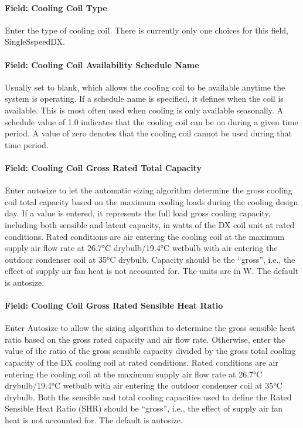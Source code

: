 \paragraph{Field: Cooling Coil Type}\label{field-cooling-coil-type-2}

Enter the type of cooling coil. There is currently only one choices for this field, SingleSspeedDX.

\paragraph{Field: Cooling Coil Availability Schedule Name}\label{field-cooling-coil-availability-schedule-name-2}

Usually set to blank, which allows the cooling coil to be available anytime the system is operating. If a schedule name is specified, it defines when the coil is available. This is most often used when cooling is only available seasonally. A schedule value of 1.0 indicates that the cooling coil can be on during a given time period. A value of zero denotes that the cooling coil cannot be used during that time period.

\paragraph{Field: Cooling Coil Gross Rated Total Capacity}\label{field-cooling-coil-gross-rated-total-capacity-1}

Enter autosize to let the automatic sizing algorithm determine the gross cooling coil total capacity based on the maximum cooling loads during the cooling design day. If a value is entered, it represents the full load gross cooling capacity, including both sensible and latent capacity, in watts of the DX coil unit at rated conditions. Rated conditions are air entering the cooling coil at the maximum supply air flow rate at 26.7°C drybulb/19.4°C wetbulb with air entering the outdoor condenser coil at 35°C drybulb. Capacity should be the ``gross'', i.e., the effect of supply air fan heat is not accounted for. The units are in W. The default is autosize.

\paragraph{Field: Cooling Coil Gross Rated Sensible Heat Ratio}\label{field-cooling-coil-gross-rated-sensible-heat-ratio-1}

Enter Autosize to allow the sizing algorithm to determine the gross sensible heat ratio based on the gross rated capacity and air flow rate. Otherwise, enter the value of the ratio of the gross sensible capacity divided by the gross total cooling capacity of the DX cooling coil at rated conditions. Rated conditions are air entering the cooling coil at the maximum supply air flow rate at 26.7°C drybulb/19.4°C wetbulb with air entering the outdoor condenser coil at 35°C drybulb. Both the sensible and total cooling capacities used to define the Rated Sensible Heat Ratio (SHR) should be ``gross'', i.e., the effect of supply air fan heat is not accounted for. The default is autosize.

